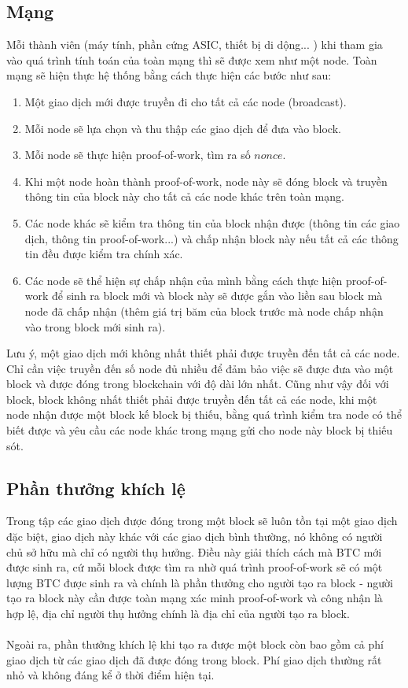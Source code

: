 \subsection{Mạng}
Mỗi thành viên (máy tính, phần cứng ASIC, thiết bị di dộng... ) khi tham gia vào quá 
trình tính toán của toàn mạng thì sẽ được xem như một node. Toàn mạng sẽ hiện thực hệ 
thống bằng cách thực hiện các bước như sau:
\begin{enumerate}
\item Một giao dịch mới được truyền đi cho tất cả các node (broadcast).
\item Mỗi node sẽ lựa chọn và thu thập các giao dịch để đưa vào block.
\item Mỗi node sẽ thực hiện proof-of-work, tìm ra số $nonce$.
\item Khi một node hoàn thành proof-of-work, node này sẽ đóng block và truyền 
thông tin của block này cho tất cả các node khác trên toàn mạng.
\item Các node khác sẽ kiểm tra thông tin của block nhận được (thông tin các 
giao dịch, thông tin proof-of-work...) và chấp nhận block này nếu tất cả 
các thông tin đều được kiểm tra chính xác.
\item Các node sẽ thể hiện sự chấp nhận của mình bằng cách thực hiện proof-of-work 
để sinh ra block mới và block này sẽ được gắn vào liền sau block mà node đã chấp nhận 
(thêm giá trị băm của block trước mà node chấp nhận vào trong block mới sinh ra).
\end{enumerate}
Lưu ý, một giao dịch mới không nhất thiết phải được truyền đến tất cả các node. 
Chỉ cần việc truyền đến số node đủ nhiều để đảm bảo việc sẽ được đưa vào một block 
và được đóng trong blockchain với độ dài lớn nhất. Cũng như vậy đối với block, 
block không nhất thiết phải được truyền đến tất cả các node, khi một node nhận 
được một block kế block bị thiếu, bằng quá trình kiểm tra node có thể biết được 
và yêu cầu các node khác trong mạng gửi cho node này block bị thiếu sót.
\subsection{Phần thưởng khích lệ}
Trong tập các giao dịch được đóng trong một block sẽ luôn tồn tại một giao dịch 
đặc biệt, giao dịch này khác với các giao dịch bình thường, nó không có người chủ 
sở hữu mà chỉ có người thụ hưởng. Điều này giải thích cách mà BTC mới được sinh 
ra, cứ mỗi block được tìm ra nhờ quá trình proof-of-work sẽ có một lượng BTC 
được sinh ra và chính là phần thưởng cho người tạo ra block - người tạo ra block 
này cần được toàn mạng xác minh proof-of-work và công nhận là hợp lệ, địa chỉ 
người thụ hưởng chính là địa chỉ của người tạo ra block.\\\\
Ngoài ra, phần thưởng khích lệ khi tạo ra được một block còn bao gồm cả phí giao 
dịch từ các giao dịch đã được đóng trong block. Phí giao dịch thường rất nhỏ và
không đáng kể ở thời điểm hiện tại.
